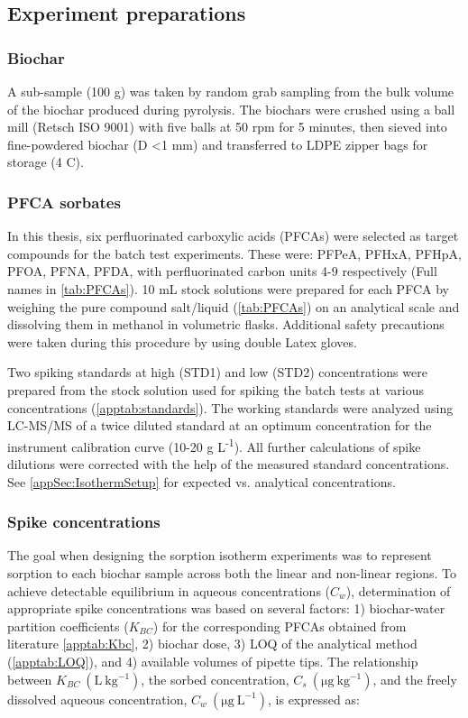 \subsection{Experiment preparations}
\subsubsection{Biochar}
A sub-sample (100 g) was taken by random grab sampling from the bulk volume of the biochar produced during pyrolysis. The biochars were crushed using a ball mill (Retsch ISO 9001) with five balls at 50 rpm for 5 minutes, then sieved into fine-powdered biochar (D \textless 1 mm) and transferred to LDPE zipper bags for storage (4 \textdegree C). 

\subsubsection{PFCA sorbates}\label{sec:PFCAanalytic}
In this thesis, six perfluorinated carboxylic acids (PFCAs) were selected as target compounds for the batch test experiments. These were: PFPeA, PFHxA, PFHpA, PFOA, PFNA, PFDA, with perfluorinated carbon units 4-9 respectively (Full names in \cref{tab:PFCAs}). 10 mL stock solutions were prepared for each PFCA by weighing the pure compound salt/liquid (\cref{tab:PFCAs}) on an analytical scale and dissolving them in methanol in volumetric flasks. Additional safety precautions were taken during this procedure by using double Latex gloves. 

Two spiking standards at high (STD1) and low (STD2) concentrations were prepared from the stock solution used for spiking the batch tests at various concentrations (\cref{apptab:standards}). The working standards were analyzed using LC-MS/MS of a twice diluted standard at an optimum concentration for the instrument calibration curve (10-20 \textmu g L\textsuperscript{-1}). All further calculations of spike dilutions were corrected with the help of the measured standard concentrations. See \cref{appSec:IsothermSetup} for expected vs. analytical concentrations. 



\subsubsection{Spike concentrations}
The goal when designing the sorption isotherm experiments was to represent sorption to each biochar sample across both the linear and non-linear regions. To achieve detectable equilibrium in aqueous concentrations ($C_w$), determination of appropriate spike concentrations was based on several factors: 1) biochar-water partition coefficients ($K_{BC}$) for the corresponding PFCAs obtained from literature \cite{Xiao2017} \cref{apptab:Kbc}, 2) biochar dose, 3) LOQ of the analytical method (\cref{apptab:LOQ}), and 4) available volumes of pipette tips. The relationship between $K_{BC}~\mathrm{(L~kg^{-1})}$, the sorbed concentration, $C_s~\mathrm{(\mu g~kg^{-1})}$, and the freely dissolved aqueous concentration, $C_w~\mathrm{(\mu g~L^{-1})}$, is expressed as:

